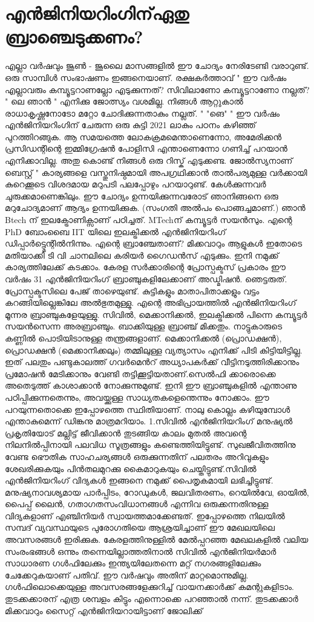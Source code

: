 \documentclass[10pt,a4paper]{report}
\begin{document}
  \section{ എന്‍ജിനിയറിംഗിന്ഏതു ബ്രാഞ്ചെടുക്കണം? }
  എല്ലാ വര്‍ഷവും ജൂണ്‍ - ജൂലൈ മാസങ്ങളില്‍ ഈ ചോദ്യം നേരിടേണ്ടി വരാറുണ്ട്. ഒരു സാമ്പിൾ സംഭാഷണം ഇങ്ങനെയാണ്. രക്ഷകർത്താവ് " ഈ വര്‍ഷം എല്ലാവരും കമ്പ്യൂട്ടറാണല്ലോ എടുക്കുന്നത്? സിവിലാണോ കമ്പ്യൂട്ടറാണോ നല്ലത്? " ലെ ഞാൻ " എനിക്കു ജോത്സ്യം വശമില്ല. നിങ്ങള്‍ ആറ്റുകാല്‍ രാധാകൃഷ്ണനോടോ മറ്റോ ചോദിക്കുന്നതാകും നല്ലത്. " "ങെ" " ഈ വര്‍ഷം എന്‍ജിനിയറിംഗിന് ചേരുന്ന ഒരു കുട്ടി 2021 ലാകും പഠനം കഴിഞ്ഞ് പുറത്തിറങ്ങുക. ആ സമയത്തെ ലോകക്രമമെന്താണെന്നോ, അമേരിക്കന്‍ പ്രസിഡന്റിന്റെ ഇമ്മിഗ്രേഷന്‍ പോളിസി എന്താണെന്നോ ഗണിച്ച് പറയാന്‍ എനിക്കാവില്ല. അതു കൊണ്ട് നിങ്ങൾ ഒരു റിസ്ക് എടുക്കണ്ട. ജോൽസ്യനാണ് ബെസ്റ്റ് " കാര്യങ്ങളെ വസ്തുനിഷ്ഠമായി അപഗ്രഥിക്കാന്‍ താല്‍പര്യമുള്ള വര്‍ക്കായി കുറെക്കൂടെ വിശദമായ മറുപടി പലപ്പോഴും പറയാറുണ്ട്. കേള്‍ക്കുന്നവര്‍ ചുരുക്കമാണെങ്കിലും. ഈ ചോദ്യം ഉന്നയിക്കുന്നവരോട് ഞാനിങ്ങനെ ഒരു മറുചോദ്യമാണ് ആദ്യം ഉന്നയിക്കുക. (സംഗതി അല്‍പം പൊങ്ങച്ചമാണ്.) ഞാന്‍ Btech ന് ഇലക്ട്രോണിക്സാണ് പഠിച്ചത്. MTechന് കമ്പ്യൂട്ടര്‍ സയന്‍സും. എന്റെ PhD ബോംബൈ IIT യിലെ ഇലക്ട്രിക്കല്‍ എന്‍ജിനിയറിംഗ് ഡിപ്പാര്‍ട്ട്മെന്റില്‍നിന്നും. എന്റെ ബ്രാഞ്ചേതാണ്? മിക്കവാറും ആളുകള്‍ ഇതോടെ മതിയാക്കി ടി വി ചാനലിലെ കരിയര്‍ ഗൈഡന്‍സ് എടുക്കും. ഇനി നമുക്ക് കാര്യത്തിലേക്ക് കടക്കാം. കേരള സര്‍ക്കാരിന്റെ പ്രോസ്പക്ടസ് പ്രകാരം ഈ വര്‍ഷം 31 എന്‍ജിനിയറിംഗ് ബ്രാഞ്ചുകളിലേക്കാണ് അഡ്മിഷന്‍. ഞെട്ടരുത്. പ്രോസ്പക്ടസിലെ പേജ് താഴെയുണ്ട്. കുട്ടികളും മാതാപിതാക്കളും വട്ടം കറങ്ങിയില്ലെങ്കിലേ അൽഭുതമുള്ളു. എന്റെ അഭിപ്രായത്തില്‍ എന്‍ജിനിയറിംഗ് മൂന്നര ബ്രാഞ്ചുകളേയുള്ളു. സിവില്‍, മെക്കാനിക്കല്‍, ഇലക്ട്രിക്കല്‍ പിന്നെ കമ്പ്യൂട്ടര്‍ സയന്‍സെന്ന അരബ്രാഞ്ചും. ബാക്കിയുള്ള ബ്രാഞ്ച് മിക്കതും. നാട്ടുകാരുടെ കണ്ണില്‍ പൊടിയിടാനുള്ള തന്ത്രങ്ങളാണ്. മെക്കാനിക്കൽ (പ്രൊഡക്ഷൻ), പ്രൊഡക്ഷൻ (മെക്കാനിക്കലും) തമ്മിലുള്ള വ്യത്യാസം എനിക്ക് പിടി കിട്ടിയിട്ടില്ല. ഇത് പലതും പണ്ടുകാലത്ത് ഗവർമെൻറ് അധ്യാപകര്‍ക്ക് വീട്ടിനടുത്തിരിക്കാനും പ്രമോഷൻ മേടിക്കാനും വേണ്ടി തട്ടിക്കൂട്ടിയതാണ്.സെൽഫി ക്കാരൊക്കെ അതെടുത്ത് കാശാക്കാൻ നോക്കുന്നുമുണ്ട്. ഇനി ഈ ബ്രാഞ്ചുകളില്‍ എന്താണു പഠിപ്പിക്കുന്നതെന്നും, അവയ്ക്കുള്ള സാധ്യതകളെന്തെന്നും നോക്കാം. ഈ പറയുന്നതൊക്കെ ഇപ്പോഴത്തെ സ്ഥിതിയാണ്. നാലു കൊല്ലം കഴിയുമ്പോള്‍ എന്താകുമെന്ന് ഡിങ്കനു മാത്രമറിയാം. 1.സിവില്‍ എന്‍ജിനിയറിംഗ് മനുഷ്യല്‍ പ്രകൃതിയോട് മല്ലിട്ട് ജീവിക്കാന്‍ തുടങ്ങിയ കാലം മുതല്‍ അവന്റെ നിലനില്‍പ്പിനായി പലവിധ സൂത്രങ്ങളും കണ്ടെത്തിയിട്ടുണ്ട്. സുഖജീവിതത്തിനു വേണ്ട ഭൌതിക സാഹചര്യങ്ങള്‍ ഒരുക്കുന്നതിന് പലതരം അറിവുകളും ശേഖരിക്കുകയും പിന്‍തലമുറക്കു കൈമാറുകയും ചെയ്തിട്ടുണ്ട്.സിവില്‍ എന്‍ജിനിയറിംഗ് വിദ്യകള്‍ ഇങ്ങനെ നമുക്ക് പൈതൃകമായി ലഭിച്ചിട്ടുണ്ട്. മനുഷ്യനാവശ്യമായ പാര്‍പ്പിടം, റോഡുകള്‍, ജലവിതരണം, റെയില്‍വേ, ഓയില്‍, പൈപ്പ് ലൈന്‍, ഗതാഗതസംവിധാനങ്ങള്‍ എന്നിവ ഒരുക്കന്നതിനുള്ള വിദ്യകളാണ് എഞ്ചിനിയര്‍ സ്വായത്തമാക്കേണ്ടത്. ഇപ്പോഴത്തെ നിലയില്‍ സമ്പദ് വ്യവസ്ഥയുടെ പുരോഗതിയെ ആശ്രയിച്ചാണ് ഈ മേഖലയിലെ അവസരങ്ങള്‍ ഇരിക്കുക. കേരളത്തിനുള്ളില്‍ മേല്‍പ്പറഞ്ഞ മേഖലകളില്‍ വലിയ സംരംഭങ്ങള്‍ ഒന്നും തന്നെയില്ലാത്തതിനാല്‍ സിവില്‍ എന്‍ജിനിയര്‍മാര്‍ സാധാരണ ഗള്‍ഫിലേക്കും ഇന്ത്യയിലേതന്നെ മറ്റ് നഗരങ്ങളിലേക്കും ചേക്കേറുകയാണ് പതിവ്. ഈ വര്‍ഷവും അതിന് മാറ്റമൊന്നുമില്ല. ഗള്‍ഫിലൊക്കെയുള്ള അവസരങ്ങളേക്കുറിച്ച് വായനക്കാര്‍ക്ക് കമന്റുകളിടാം. തുടക്കക്കാരന് എത്ര ശമ്പളം കിട്ടും എന്നൊക്കെ പറഞ്ഞാല്‍‌ നന്ന്. തുടക്കക്കാര്‍ മിക്കവാറും സൈറ്റ് എന്‍ജിനിയറായിട്ടാണ് ജോലിക്ക് 
\end{document}
